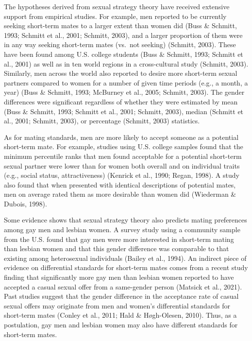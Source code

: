 \documentclass[
  11pt,
]{article}
\begin{document}
The hypotheses derived from sexual strategy theory have received
extensive support from empirical studies. For example, men reported to
be currently seeking short-term mates to a larger extent than women did
(Buss \& Schmitt, 1993; Schmitt et al., 2001; Schmitt, 2003), and a
larger proportion of them were in any way seeking short-term mates
(vs.~not seeking) (Schmitt, 2003). These have been found among U.S.
college students (Buss \& Schmitt, 1993; Schmitt et al., 2001) as well
as in ten world regions in a cross-cultural study (Schmitt, 2003).
Similarly, men across the world also reported to desire more short-term
sexual partners compared to women for a number of given time periods
(e.g., a month, a year) (Buss \& Schmitt, 1993; McBurney et al., 2005;
Schmitt, 2003). The gender differences were significant regardless of
whether they were estimated by mean (Buss \& Schmitt, 1993; Schmitt et
al., 2001; Schmitt, 2003), median (Schmitt et al., 2001; Schmitt, 2003),
or percentage (Schmitt, 2003) statistics.

As for mating standards, men are more likely to accept someone as a
potential short-term mate. For example, studies using U.S. college
samples found that the minimum percentile ranks that men found
acceptable for a potential short-term sexual partner were lower than for
women both overall and on individual traits (e.g., social status,
attractiveness) (Kenrick et al., 1990; Regan, 1998). A study also found
that when presented with identical descriptions of potential mates, men
on average rated them as more desirable than women did (Wiederman \&
Dubois, 1998).

Some evidence shows that sexual strategy theory also predicts mating
preferences among gay men and lesbian women. A survey study using a
community sample from the U.S. found that gay men were more interested
in short-term mating than lesbian women and that this gender difference
was comparable to that existing among heterosexual individuals (Bailey
et al., 1994). An indirect piece of evidence on differential standards
for short-term mates comes from a recent study finding that
significantly more gay men than lesbian women reported to have accepted
a casual sexual offer from a same-gender person (Matsick et al., 2021).
Past studies suggest that the gender difference in the acceptance rate
of casual sexual offers may originate from men and women's differential
standards for short-term mates (Conley et al., 2011; Hald \&
Høgh-Olesen, 2010). Thus, as a postulation, gay men and lesbian women
may also have different standards for short-term mates.
\end{document}
